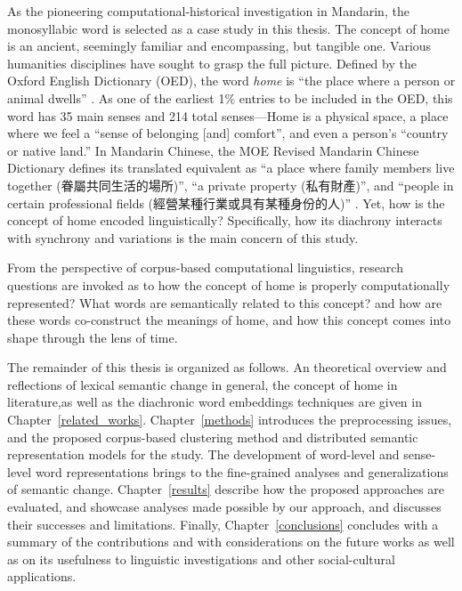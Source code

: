 As the pioneering computational-historical investigation in Mandarin, the monosyllabic word  is selected as a case study in this thesis. The concept of home is an ancient, seemingly familiar and encompassing, but tangible one. Various humanities disciplines have sought to grasp the full picture. Defined by the Oxford English Dictionary (OED), the word \textit{home} is ``the place where a person or animal dwells'' . As one of the earliest 1\% entries to be included in the OED, this word has 35 main senses and 214 total senses—Home is a physical space, a place where we feel a ``sense of belonging [and] comfort'', and even a person's ``country or native land.'' In Mandarin Chinese, the MOE Revised Mandarin Chinese Dictionary defines its translated equivalent  as ``a place where family members live together (眷屬共同生活的場所)'', ``a private property (私有財產)'', and ``people in certain professional fields (經營某種行業或具有某種身份的人)'' . Yet, how is the concept of home encoded linguistically? Specifically, how its diachrony interacts with synchrony and variations is the main concern of this study.

From the perspective of corpus-based computational linguistics, research questions are invoked as to how the concept of home is properly computationally represented? What words are semantically related to this concept? and how are these words co-construct the meanings of home, and how this concept comes into shape through the lens of time.

The remainder of this thesis is organized as follows. An theoretical overview and reflections of lexical semantic change in general, the concept of home in literature,as well as the diachronic word embeddings techniques are given in Chapter~\ref{related_works}. Chapter~\ref{methods} introduces the preprocessing issues, and the proposed corpus-based clustering method and distributed semantic representation models for the study. The development of word-level and sense-level word representations brings to the fine-grained analyses and generalizations of semantic change. Chapter~\ref{results} describe how the proposed approaches are evaluated, and showcase analyses made possible by our approach, and discusses their successes and limitations. Finally, Chapter~\ref{conclusions} concludes with a summary of the contributions and with considerations on the future works as well as on its usefulness to linguistic investigations and other social-cultural  applications.



